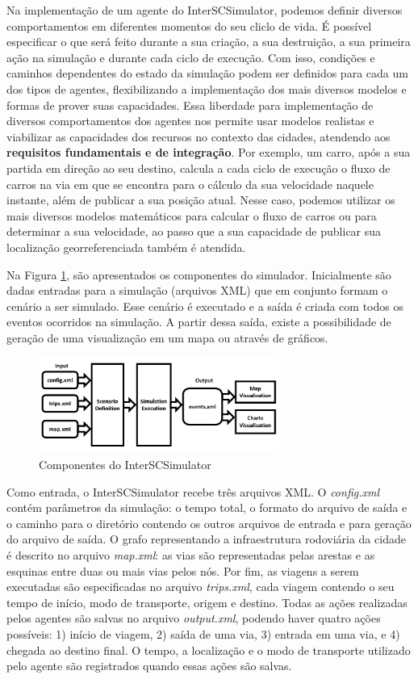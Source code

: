 Na implementação de um agente do InterSCSimulator, podemos definir diversos comportamentos em diferentes momentos do seu cliclo de vida.
É possível especificar o que será feito durante a sua criação, a sua destruição, a sua primeira ação na simulação e durante cada ciclo de execução.
Com isso, condições e caminhos dependentes do estado da simulação podem ser definidos para cada um dos tipos de agentes, flexibilizando a implementação dos
mais diversos modelos e formas de prover suas capacidades.
Essa liberdade para implementação de diversos comportamentos dos agentes nos permite usar modelos realistas e viabilizar as capacidades dos recursos no contexto das cidades,
atendendo aos \textbf{requisitos fundamentais e de integração}.
Por exemplo, um carro, após a sua partida em direção ao seu destino, calcula a cada ciclo de execução o fluxo de carros na via em que se encontra para o cálculo da
sua velocidade naquele instante, além de publicar a sua posição atual.
Nesse caso, podemos utilizar os mais diversos modelos matemáticos para calcular o fluxo de carros ou para determinar a sua velocidade, ao passo que a sua capacidade
de publicar sua localização georreferenciada também é atendida.

Na Figura \ref{fig:simulator_components}, são apresentados os componentes do simulador.
Inicialmente são dadas entradas para a simulação (arquivos XML) que em conjunto formam o cenário a ser simulado.
Esse cenário é executado e a saída é criada com todos os eventos ocorridos na simulação.
A partir dessa saída, existe a possibilidade de geração de uma visualização em um mapa ou através de gráficos.

\begin{figure}[ht]
	\centering
	\includegraphics[width=0.7\textwidth]{figuras/Components.pdf}
	\caption{Componentes do InterSCSimulator}
	\label{fig:simulator_components}
\end{figure}

Como entrada, o InterSCSimulator recebe três arquivos XML.
O \textit{config.xml} contém parâmetros da simulação: o tempo total, o formato do
arquivo de saída e o caminho para o diretório contendo os outros arquivos de entrada e para geração do arquivo de saída.
O grafo representando a infraestrutura rodoviária da cidade é descrito no arquivo \textit{map.xml}: as vias são representadas pelas arestas e as esquinas entre
duas ou mais vias pelos nós.
Por fim, as viagens a serem executadas são especificadas no arquivo \textit{trips.xml}, cada viagem contendo o seu tempo de início, modo de transporte, origem e destino.
Todas as ações realizadas pelos agentes são salvas no arquivo \textit{output.xml}, podendo haver quatro ações possíveis: 1) início de viagem, 2) saída de uma via,
3) entrada em uma via, e 4) chegada ao destino final.
O tempo, a localização e o modo de transporte utilizado pelo agente são registrados quando essas ações são salvas.

